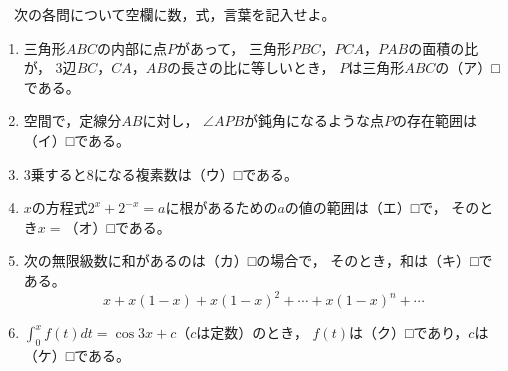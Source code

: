 \begin{problem}
  　次の各問について空欄に数，式，言葉を記入せよ。
\begin{enumerate}
\item 三角形$ABC$の内部に点$P$があって，
三角形$PBC$，$PCA$，$PAB$の面積の比が，
3辺$BC$，$CA$，$AB$の長さの比に等しいとき，
$P$は三角形$ABC$の（ア）□である。
\item 空間で，定線分$AB$に対し，
$\angle APB$が鈍角になるような点$P$の存在範囲は（イ）□である。
\item 3乗すると8になる複素数は（ウ）□である。
\item $x$の方程式$2^x+2^{-x}=a$に根があるための$a$の値の範囲は（エ）□で，
そのとき$x=$（オ）□である。
\item 次の無限級数に和があるのは（カ）□の場合で，
そのとき，和は（キ）□である。
\[ x+x(1-x)+x{(1-x)}^2+\cdots+x{(1-x)}^n+\cdots \]
\item $\displaystyle\int_0^xf(t)dt=\cos3x+c$（$c$は定数）のとき，
$f(t)$は（ク）□であり，$c$は（ケ）□である。
\end{enumerate}

\end{problem}
